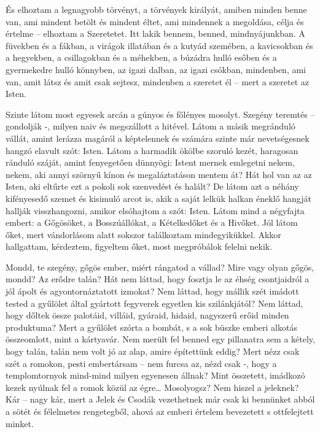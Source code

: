 \documentclass{IEEEtran}
\begin{document}
És elhoztam a legnagyobb törvényt, a törvények királyát, amiben minden benne
van, ami mindent betölt és mindent éltet, ami mindennek a megoldása, célja és
értelme – elhoztam a Szeretetet. Itt lakik bennem, benned, mindnyájunkban. A
füvekben és a fákban, a virágok illatában és a kutyád szemében, a kavicsokban
és a hegyekben, a csillagokban és a méhekben, a búzádra hulló esőben és a
gyermekedre hulló könnyben, az igazi dalban, az igazi csókban, mindenben, ami
van, amit látsz és amit csak sejtesz, mindenben a szeretet él – mert a
szeretet az Isten.

Szinte látom most egyesek arcán a gúnyos és főlényes mosolyt. Szegény teremtés
– gondolják -, milyen naiv és megszállott a hitével. Látom a másik megránduló
vállát, amint lerázza magáról a képtelennek és számára szinte már
nevetségesnek hangzó elavult szót: Isten. Látom a harmadik ökölbe szoruló
kezét, haragosan ránduló száját, amint fenyegetően dünnyögi: Istent mernek
emlegetni nekem, nekem, aki annyi szörnyű kínon és megaláztatáson mentem át?
Hát hol van az az Isten, aki eltűrte ezt a pokoli sok szenvedést és halált? De
látom azt a néhány kifényesedő szemet és kisimuló arcot is, akik a saját
lelkük halkan éneklő hangját hallják visszhangozni, amikor elsóhajtom a szót:
Isten. Látom mind a négyfajta embert: a Gőgösöket, a Bosszúállókat, a
Kételkedőket és a Hivőket. Jól látom őket, mert vándorlásom alatt sokszor
találkoztam mindegyikükkel. Akkor hallgattam, kérdeztem, figyeltem őket, most
megpróbálok felelni nekik.

Mondd, te szegény, gőgös ember, miért rángatod a vállad? Mire vagy olyan
gőgös, mondd? Az erődre talán? Hát nem láttad, hogy fosztja le az éhség
csontjaidról a jól ápolt és agyontornáztatott izmokat? Nem láttad, hogy mállik
szét imádott tested a gyűlölet által gyártott fegyverek egyetlen kis
szilánkjától? Nem láttad, hogy dőltek össze palotáid, villáid, gyáraid,
hidaid, nagyszerű erőid minden produktuma?
Mert a gyűlölet szórta a bombát, s a sok büszke emberi alkotás összeomlott,
mint a kártyavár. Nem merült fel benned egy pillanatra sem a kétely, hogy
talán, talán nem volt jó az alap, amire építettünk eddig? Mert nézz csak szét
a romokon, pesti embertársam – nem furcsa az, nézd csak -, hogy a
templomtornyok mind-mind milyen egyenesen állnak? Mint összetett, imádkozó
kezek nyúlnak fel a romok közül az égre…
Mosolyogsz? Nem hiszel a jeleknek? Kár – nagy kár, mert a Jelek és Csodák
vezethetnek már csak ki bennünket abból a sötét és félelmetes rengetegből,
ahová az emberi értelem bevezetett s ottfelejtett minket.
\end{document}
